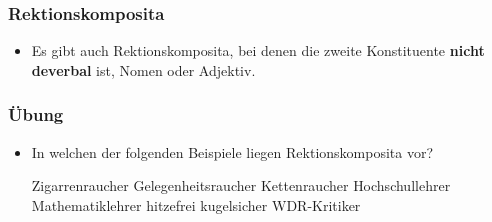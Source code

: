 \begin{frame}
\frametitle{Rektionskomposita}

\begin{itemize}
	\item Es gibt auch Rektionskomposita, bei denen die zweite Konstituente \textbf{nicht deverbal} ist, \zB Nomen oder Adjektiv.
	
	\settowidth{}
	\ea 

		 
		
		

		\z 
	\z

		 
\end{itemize}

\end{frame}


\begin{frame}
	\frametitle{Übung}
	
	\begin{itemize}
		\item In welchen der folgenden Beispiele liegen Rektionskomposita vor?
		
		\ea\label{ex:05bUE3.1}
			\ea Zigarrenraucher
			\ex Gelegenheitsraucher
			\ex Kettenraucher
			\z
		\ex\label{ex:05bUE3.2}
			\ea Hochschullehrer
			\ex Mathematiklehrer
			\z
		\ex\label{ex:05bUE3.3}
			\ea hitzefrei
			\ex kugelsicher
			\z
		\ex\label{ex:05bUE3.4}
			\ea WDR-Kritiker
			\z
		\z
	\end{itemize}
	
	
\end{frame}

